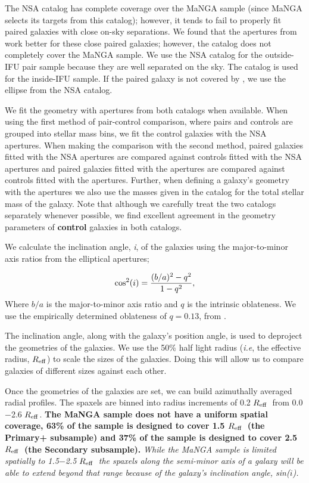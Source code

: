 \documentclass[iop,revtex4,twocolumn,apj,numberedappendix,appendixfloats]{emulateapj}
\newcommand{\reff}{$R_{\rm eff}$}
\begin{document}
The NSA catalog has complete coverage over the MaNGA sample (since MaNGA selects its targets from this catalog); however, it tends to fail to properly fit paired galaxies with close on-sky separations. We found that the apertures from \citet{Simard:2011} work better for these close paired galaxies; however, the catalog does not completely cover the MaNGA sample. We use the NSA catalog for the outside-IFU pair sample because they are well separated on the sky. The \citet{Simard:2011} catalog is used for the inside-IFU sample. If the paired galaxy is not covered by \citet{Simard:2011}, we use the ellipse from the NSA catalog. 

We fit the geometry with apertures from both catalogs when available. When using the first method of pair-control comparison, where pairs and controls are grouped into stellar mass bins, we fit the control galaxies with the NSA apertures. When making the comparison with the second method, paired galaxies fitted with the NSA apertures are compared against controls fitted with the NSA apertures and paired galaxies fitted with the \citet{Simard:2011} apertures are compared against controls fitted with the \citet{Simard:2011} apertures. Further, when defining a galaxy's geometry with the \citet{Simard:2011} apertures we also use the masses given in the catalog for the total stellar mass of the galaxy. Note that although we carefully treat the two catalogs separately whenever possible, we find excellent agreement in the geometry parameters of \textbf{control} galaxies in both catalogs.

We calculate the inclination angle, {\it i}, of the galaxies using the major-to-minor axis ratios from the elliptical apertures;

\begin{equation}
{\rm cos^2}(i) = \frac{(b/a)^2 - q^2}{1 - q^2},
\end{equation}
Where $b/a$ is the major-to-minor axis ratio and $q$ is the intrinsic oblateness. We use the empirically determined oblateness of $q = 0.13$, from \citet{Giovanelli:1994}.

The inclination angle, along with the galaxy's position angle, is used to deproject the geometries of the galaxies. We use the 50\% half light radius ({\it i.e}, the effective radius, \reff) to scale the sizes of the galaxies. Doing this will allow us to compare galaxies of different sizes against each other.

Once the geometries of the galaxies are set, we can build azimuthally averaged radial profiles. The spaxels are binned into radius increments of 0.2 \reff\ from 0.0$-$2.6 \reff. \textbf{The MaNGA sample does not have a uniform spatial coverage, 63\% of the sample is designed to cover 1.5 \reff\ (the Primary+ subsample) and 37\% of the sample is designed to cover 2.5 \reff\ (the Secondary subsample).} {\it While the MaNGA sample is limited spatially to 1.5$-$2.5 \reff\, the spaxels along the semi-minor axis of a galaxy will be able to extend beyond that range because of the galaxy's inclination angle, sin($i$). }
\end{document}
